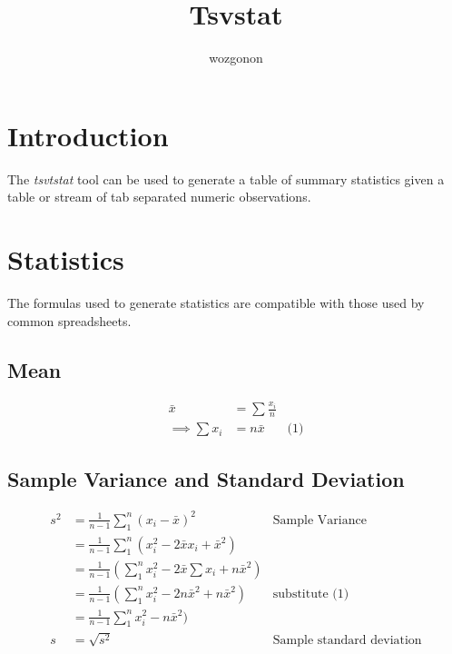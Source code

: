 \documentclass[11pt]{article} %
\title{Tsvstat}
\author{wozgonon}
\date{} %
\begin{document}
\maketitle

\section{Introduction}

The {\it tsvtstat} tool can be used to generate a table of summary statistics given a table or stream of tab separated numeric observations.


\section{Statistics}

The formulas used to generate statistics are compatible with those used by common spreadsheets.

\subsection{Mean}

\begin{align*}
\bar{x}&=\sum \frac{x_i}{n}  \\
\implies  \sum x_i &= n\bar{x} & \text{(1)}
\end{align*}

\subsection{Sample Variance and Standard Deviation}

\begin{align*}
s^2&= \frac{1}{n-1}\sum_1^n (x_i-\bar{x})^2 & \text{Sample Variance}\\
              &=\frac{1}{n-1}\sum_1^n (x_i^2 - 2\bar{x} x_i +\bar{x}^2) \\
              &=\frac{1}{n-1}(\sum_1^n x_i^2 - 2\bar{x} \sum x_i +n\bar{x}^2) \\
              &=\frac{1}{n-1}(\sum_1^n x_i^2 - 2n\bar{x}^2 +n\bar{x}^2) & \text{substitute (1)}\\
              &=\frac{1}{n-1}\sum_1^n x_i^2 - n\bar{x}^2) \\
s &= \sqrt{s^2} & \text{Sample standard deviation} \\
\end{align*}
\end{document}
